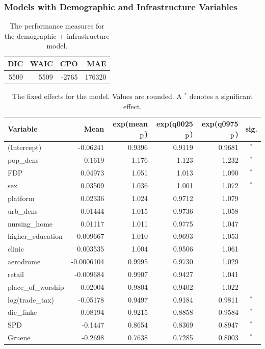 \subsubsection{Models with Demographic and Infrastructure Variables}
\begin{table}[H] 
\caption{The performance measures for the demographic + infrastructure model. \label{allGermany_nospatial}}
\begin{tabular}{r r r r}
\toprule
\textbf{DIC}	& \textbf{WAIC} & \textbf{CPO} & \textbf{MAE}\\
\midrule
5509 & 5509 & -2765 &  176320 \\
\bottomrule
\end{tabular}
\end{table}
\begin{table}[H]
\caption{The fixed effects for the model. Values are rounded. A $^*$ denotes a significant effect. \label{FixedAllGermany_nospatial}}
\begin{tabular}{l r r r r c}
\toprule
\textbf{Variable}	& \textbf{Mean}	& \textbf{exp(mean$_{\hbox{p}}$)} & \textbf{exp(q0025$_{\hbox{p}}$)} & \textbf{exp(q0975$_{\hbox{p}}$)} & \textbf{sig.}\\
\midrule
(Intercept) & -0.06241 & 0.9396 & 0.9119 & 0.9681 & $^*$\\
pop\_dens & 0.1619 & 1.176 & 1.123 & 1.232 & $^*$\\
FDP & 0.04973 & 1.051 & 1.013 & 1.090 & $^*$\\
sex & 0.03509 & 1.036 & 1.001 & 1.072 & $^*$\\
platform & 0.02336 & 1.024 & 0.9712 & 1.079 \\
urb\_dens & 0.01444 & 1.015 & 0.9736 & 1.058 \\
nursing\_home & 0.01117 & 1.011 & 0.9775 & 1.047 \\
higher\_education & 0.009667 & 1.010 & 0.9693 & 1.053 \\
clinic & 0.003535 & 1.004 & 0.9506 & 1.061 \\
aerodrome & -0.0006104 & 0.9995 & 0.9730 & 1.029 \\
retail & -0.009684 & 0.9907 & 0.9427 & 1.041 \\
place\_of\_worship & -0.02004 & 0.9804 & 0.9402 & 1.022 \\
log(trade\_tax) & -0.05178 & 0.9497 & 0.9184 & 0.9811 & $^*$\\
die\_linke & -0.08194 & 0.9215 & 0.8858 & 0.9584 & $^*$\\
SPD & -0.1447 & 0.8654 & 0.8369 & 0.8947 & $^*$\\
Gruene & -0.2698 & 0.7638 & 0.7285 & 0.8003 & $^*$\\
\bottomrule
\end{tabular}
\end{table}
